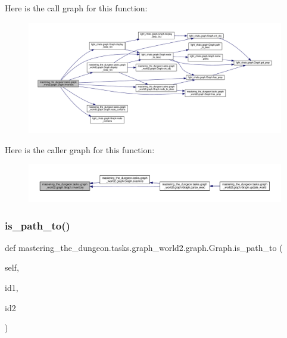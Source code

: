 Here is the call graph for this function\+:
\nopagebreak
\begin{figure}[H]
\begin{center}
\leavevmode
\includegraphics[width=350pt]{classmastering__the__dungeon_1_1tasks_1_1graph__world2_1_1graph_1_1Graph_a32f9d5878b445f63dc2bc2745a0ec104_cgraph}
\end{center}
\end{figure}
Here is the caller graph for this function\+:
\nopagebreak
\begin{figure}[H]
\begin{center}
\leavevmode
\includegraphics[width=350pt]{classmastering__the__dungeon_1_1tasks_1_1graph__world2_1_1graph_1_1Graph_a32f9d5878b445f63dc2bc2745a0ec104_icgraph}
\end{center}
\end{figure}
\mbox{\label{classmastering__the__dungeon_1_1tasks_1_1graph__world2_1_1graph_1_1Graph_a13eacdd0c2f6a903a63386016d165344}} 
\subsubsection{\texorpdfstring{is\+\_\+path\+\_\+to()}{is\_path\_to()}}
{\footnotesize\ttfamily def mastering\+\_\+the\+\_\+dungeon.\+tasks.\+graph\+\_\+world2.\+graph.\+Graph.\+is\+\_\+path\+\_\+to (\begin{DoxyParamCaption}\item[{}]{self,  }\item[{}]{id1,  }\item[{}]{id2 }\end{DoxyParamCaption})}



